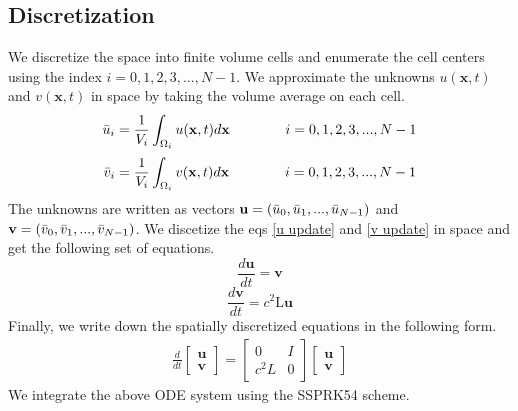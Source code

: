 \documentclass[12pt]{article}
\begin{document}
\subsection*{Discretization}
We discretize the space into finite volume cells and enumerate the cell centers using the index $i=0,1,2,3,...,N-1$. We approximate the unknowns $u(\mathbf{x},t)$ and $v(\mathbf{x},t)$ in space by taking the volume average on each cell.
\begin{equation}
    \Bar{u}_{i} = \frac{1}{V_{i}}\int_{\Omega_{i}}u(\mathbf{x},t)d\mathbf{x} \hspace{1.4cm} i=0,1,2,3,...,N-1
\end{equation}
\begin{equation}
    \Bar{v}_{i} = \frac{1}{V_{i}}\int_{\Omega_{i}}v(\mathbf{x},t)d\mathbf{x} \hspace{1.4cm} i=0,1,2,3,...,N-1
\end{equation} 
The unknowns are written as vectors $\mathbf{u} = (\Bar{u}_{0}, \Bar{u}_{1}, ..., \Bar{u}_{N-1})$ and $\mathbf{v} = (\Bar{v}_{0}, \Bar{v}_{1}, ..., \Bar{v}_{N-1})$. We discetize the eqs \ref{u update} and \ref{v update} in space and get the following set of equations.
\begin{equation}\label{discrete u update }
    \frac{d\mathbf{u}}{dt} = \mathbf{v}
\end{equation}
\begin{equation}\label{discrete v update}
    \frac{d\mathbf{v}}{dt} = c^{2}\mathrm{L}\mathbf{u}
\end{equation}
Finally, we write down the spatially discretized equations in the following form.
\begin{gather}\label{coupled equations}
 \frac{d}{d{t}}\begin{bmatrix} \mathbf{u} \\ \mathbf{v} \end{bmatrix}
 =
  \begin{bmatrix}0 & I \\c^{2}L&0 \end{bmatrix}\begin{bmatrix} \mathbf{u} \\ \mathbf{v} \end{bmatrix}
\end{gather}
We integrate the above ODE system using the SSPRK54 scheme.
\end{document}
